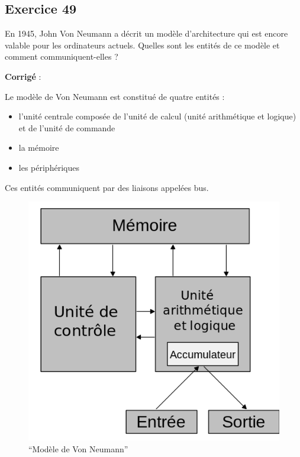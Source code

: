 \documentclass[11pt]{article}
\makeatletter
\def\maxwidth{\ifdim\Gin@nat@width>\linewidth\linewidth
    \else\Gin@nat@width\fi}
\let\Oldincludegraphics\includegraphics
\renewcommand{\includegraphics}[1]{\Oldincludegraphics[width=.8\maxwidth]{#1}}
\providecommand{\tightlist}{%
      \setlength{\itemsep}{0pt}\setlength{\parskip}{0pt}}
\makeatother
\begin{document}
    \hypertarget{exercice-49}{%
\subsection{Exercice 49}\label{exercice-49}}

En 1945, John Von Neumann a décrit un modèle d'architecture qui est
encore valable pour les ordinateurs actuels. Quelles sont les entités de
ce modèle et comment communiquent-elles ?

    \textbf{Corrigé} :

Le modèle de Von Neumann est constitué de quatre entités :

\begin{itemize}
\tightlist
\item
  l'unité centrale composée de l'unité de calcul (unité arithmétique et
  logique) et de l'unité de commande
\item
  la mémoire
\item
  les périphériques
\end{itemize}

Ces entités communiquent par des liaisons appelées bus.

\begin{figure}
\centering
\includegraphics{Von_Neumann_architecture_fr.svg.png}
\caption{``Modèle de Von Neumann''}
\end{figure}
\end{document}

